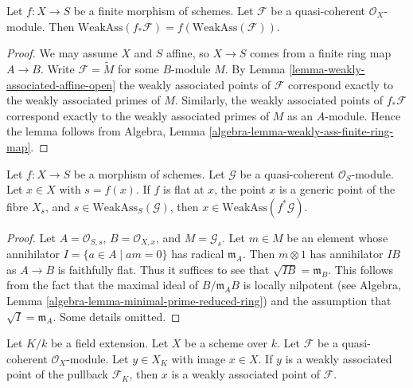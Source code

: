 \begin{lemma}
\label{lemma-weakly-associated-finite}
Let $f : X \to S$ be a finite morphism of schemes.
Let $\mathcal{F}$ be a quasi-coherent $\mathcal{O}_X$-module.
Then $\text{WeakAss}(f_*\mathcal{F}) = f(\text{WeakAss}(\mathcal{F}))$.
\end{lemma}

\begin{proof}
We may assume $X$ and $S$ affine, so $X \to S$ comes from a finite ring map
$A \to B$. Write $\mathcal{F} = \widetilde M$ for some $B$-module $M$. By
Lemma \ref{lemma-weakly-associated-affine-open}
the weakly associated points of $\mathcal{F}$ correspond exactly to the
weakly associated primes of $M$. Similarly, the weakly associated points
of $f_*\mathcal{F}$ correspond exactly to the weakly associated primes
of $M$ as an $A$-module. Hence the lemma follows from
Algebra, Lemma \ref{algebra-lemma-weakly-ass-finite-ring-map}.
\end{proof}

\begin{lemma}
\label{lemma-weakly-ass-pullback}
Let $f : X \to S$ be a morphism of schemes. Let $\mathcal{G}$ be a
quasi-coherent $\mathcal{O}_S$-module. Let $x \in X$ with $s = f(x)$.
If $f$ is flat at $x$, the point $x$ is a generic point of the fibre $X_s$, and
$s \in \text{WeakAss}_S(\mathcal{G})$, then
$x \in \text{WeakAss}(f^*\mathcal{G})$.
\end{lemma}

\begin{proof}
Let $A = \mathcal{O}_{S, s}$, $B = \mathcal{O}_{X, x}$, and
$M = \mathcal{G}_s$. Let $m \in M$ be an element whose annihilator
$I = \{a \in A \mid am = 0\}$ has radical $\mathfrak m_A$. Then
$m \otimes 1$ has annihilator $I B$ as $A \to B$ is
faithfully flat. Thus it suffices to see that $\sqrt{I B} = \mathfrak m_B$.
This follows from the fact that the maximal ideal of $B/\mathfrak m_AB$
is locally nilpotent (see
Algebra, Lemma \ref{algebra-lemma-minimal-prime-reduced-ring})
and the assumption that $\sqrt{I} = \mathfrak m_A$.
Some details omitted.
\end{proof}

\begin{lemma}
\label{lemma-weakly-ass-change-fields}
Let $K/k$ be a field extension. Let $X$ be a scheme over $k$.
Let $\mathcal{F}$ be a quasi-coherent $\mathcal{O}_X$-module.
Let $y \in X_K$ with image $x \in X$. If $y$ is a weakly
associated point of the pullback $\mathcal{F}_K$, then $x$
is a weakly associated point of $\mathcal{F}$.
\end{lemma}

